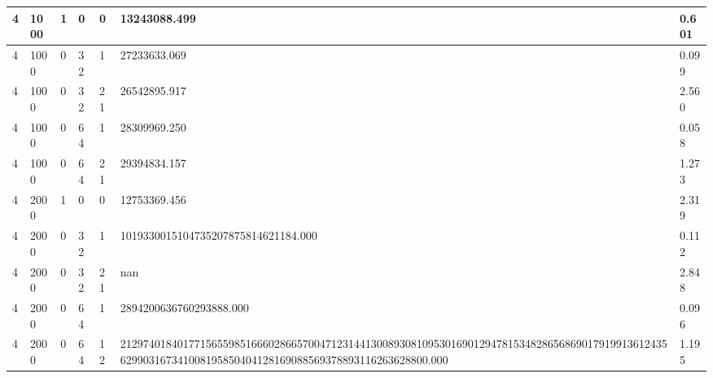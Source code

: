\begin{table}[!ht]
{\begin{tabular}{|l|l|l|l|l|l|l|}
        4 & 1000 & 1 & 0 & 0 & 13243088.499 & 0.601 \\ \hline
        4 & 1000 & 0 & 32 & 1 & 27233633.069 & 0.099 \\ \hline
        4 & 1000 & 0 & 32 & 21 & 26542895.917 & 2.560 \\ \hline
        4 & 1000 & 0 & 64 & 1 & 28309969.250 & 0.058 \\ \hline
        4 & 1000 & 0 & 64 & 21 & 29394834.157 & 1.273 \\ \hline
        4 & 2000 & 1 & 0 & 0 & 12753369.456 & 2.319 \\ \hline
        4 & 2000 & 0 & 32 & 1 & 1019330015104735207875814621184.000 & 0.112 \\ \hline
        4 & 2000 & 0 & 32 & 21 & nan & 2.848 \\ \hline
        4 & 2000 & 0 & 64 & 1 & 2894200636760293888.000 & 0.096 \\ \hline
        4 & 2000 & 0 & 64 & 12 & 212974018401771565598516660286657004712314413008930810953016901294781534828656869017919913612435629903167341008195850404128169088569378893116263628800.000 & 1.195 \\ \hline
    \end{tabular}
    }
\end{table}